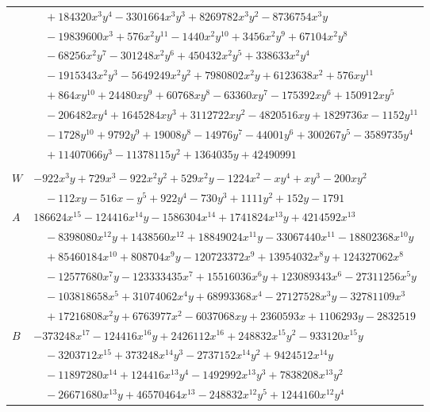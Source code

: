 \documentclass[11pt]{article}
\begin{document}
\begin{longtable}{@{}ll@{}}
 & $\quad +184320x^{3}y^{4}-3301664x^{3}y^{3}+8269782x^{3}y^{2}-8736754x^{3}y$\\
 & $\quad -19839600x^{3}+576x^{2}y^{11}-1440x^{2}y^{10}+3456x^{2}y^{9}+67104x^{2}y^{8}$\\
 & $\quad -68256x^{2}y^{7}-301248x^{2}y^{6}+450432x^{2}y^{5}+338633x^{2}y^{4}$\\
 & $\quad -1915343x^{2}y^{3}-5649249x^{2}y^{2}+7980802x^{2}y+6123638x^{2}+576xy^{11}$\\
 & $\quad +864xy^{10}+24480xy^{9}+60768xy^{8}-63360xy^{7}-175392xy^{6}+150912xy^{5}$\\
 & $\quad -206482xy^{4}+1645284xy^{3}+3112722xy^{2}-4820516xy+1829736x-1152y^{11}$\\
 & $\quad -1728y^{10}+9792y^{9}+19008y^{8}-14976y^{7}-44001y^{6}+300267y^{5}-3589735y^{4}$\\
 & $\quad +11407066y^{3}-11378115y^{2}+1364035y+42490991$\\
\addlinespace[3pt]
\multicolumn{2}{@{}l}{$i=5$, $m=144$, neighbours $8,35,48,60,162,171,174,176,183,184,222$}\\
$W$ & $-922x^{3}y+729x^{3}-922x^{2}y^{2}+529x^{2}y-1224x^{2}-xy^{4}+xy^{3}-200xy^{2}$\\
 & $\quad -112xy-516x-y^{5}+922y^{4}-730y^{3}+1111y^{2}+152y-1791$\\
$A$ & $186624x^{15}-124416x^{14}y-1586304x^{14}+1741824x^{13}y+4214592x^{13}$\\
 & $\quad -8398080x^{12}y+1438560x^{12}+18849024x^{11}y-33067440x^{11}-18802368x^{10}y$\\
 & $\quad +85460184x^{10}+808704x^{9}y-120723372x^{9}+13954032x^{8}y+124327062x^{8}$\\
 & $\quad -12577680x^{7}y-123333435x^{7}+15516036x^{6}y+123089343x^{6}-27311256x^{5}y$\\
 & $\quad -103818658x^{5}+31074062x^{4}y+68993368x^{4}-27127528x^{3}y-32781109x^{3}$\\
 & $\quad +17216808x^{2}y+6763977x^{2}-6037068xy+2360593x+1106293y-2832519$\\
$B$ & $-373248x^{17}-124416x^{16}y+2426112x^{16}+248832x^{15}y^{2}-933120x^{15}y$\\
 & $\quad -3203712x^{15}+373248x^{14}y^{3}-2737152x^{14}y^{2}+9424512x^{14}y$\\
 & $\quad -11897280x^{14}+124416x^{13}y^{4}-1492992x^{13}y^{3}+7838208x^{13}y^{2}$\\
 & $\quad -26671680x^{13}y+46570464x^{13}-248832x^{12}y^{5}+1244160x^{12}y^{4}$\\

\end{longtable}
\end{document}
